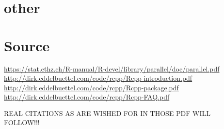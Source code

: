 \documentclass{article}
\begin{document}
        \section{other}
    \section{Source}
    \url{https://stat.ethz.ch/R-manual/R-devel/library/parallel/doc/parallel.pdf}
        \newline
        \url{http://dirk.eddelbuettel.com/code/rcpp/Rcpp-introduction.pdf}
        \newline
    \url{http://dirk.eddelbuettel.com/code/rcpp/Rcpp-package.pdf}
        \newline
    \url{http://dirk.eddelbuettel.com/code/rcpp/Rcpp-FAQ.pdf}
        \newline

REAL CITATIONS AS ARE WISHED FOR IN THOSE PDF WILL FOLLOW!!!
\end{document}
